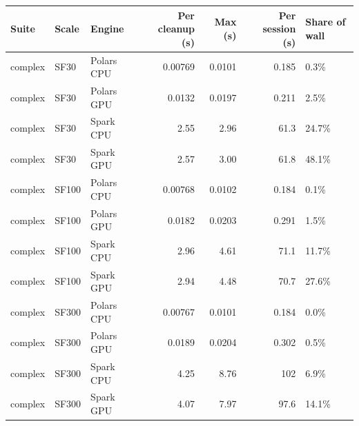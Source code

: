 \begin{tabular}{lllrrrl}
\toprule
Suite & Scale & Engine & Per cleanup (s) & Max (s) & Per session (s) & Share of wall \\
\midrule
complex & SF30 & Polars CPU & 0.00769 & 0.0101 & 0.185 & 0.3\% \\
complex & SF30 & Polars GPU & 0.0132 & 0.0197 & 0.211 & 2.5\% \\
complex & SF30 & Spark CPU & 2.55 & 2.96 & 61.3 & 24.7\% \\
complex & SF30 & Spark GPU & 2.57 & 3.00 & 61.8 & 48.1\% \\
complex & SF100 & Polars CPU & 0.00768 & 0.0102 & 0.184 & 0.1\% \\
complex & SF100 & Polars GPU & 0.0182 & 0.0203 & 0.291 & 1.5\% \\
complex & SF100 & Spark CPU & 2.96 & 4.61 & 71.1 & 11.7\% \\
complex & SF100 & Spark GPU & 2.94 & 4.48 & 70.7 & 27.6\% \\
complex & SF300 & Polars CPU & 0.00767 & 0.0101 & 0.184 & 0.0\% \\
complex & SF300 & Polars GPU & 0.0189 & 0.0204 & 0.302 & 0.5\% \\
complex & SF300 & Spark CPU & 4.25 & 8.76 & 102 & 6.9\% \\
complex & SF300 & Spark GPU & 4.07 & 7.97 & 97.6 & 14.1\% \\
\bottomrule
\end{tabular}

